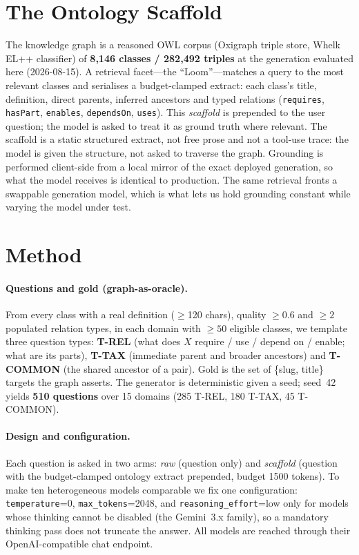 \documentclass[11pt]{article}
\begin{document}
\section{The Ontology Scaffold}\label{sec:scaffold}
The knowledge graph is a reasoned OWL corpus (Oxigraph triple store, Whelk EL++ classifier)
of \textbf{8{,}146 classes / 282{,}492 triples} at the generation evaluated here
(2026-08-15). A retrieval facet---the ``Loom''---matches a query to the most relevant classes
and serialises a budget-clamped extract: each class's title, definition, direct parents,
inferred ancestors and typed relations (\texttt{requires}, \texttt{hasPart}, \texttt{enables},
\texttt{dependsOn}, \texttt{uses}). This \emph{scaffold} is prepended to the user question; the
model is asked to treat it as ground truth where relevant. The scaffold is a static structured
extract, not free prose and not a tool-use trace: the model is given the structure, not asked to
traverse the graph. Grounding is performed client-side from a local mirror of the exact deployed
generation, so what the model receives is identical to production. The same retrieval fronts a
swappable generation model, which is what lets us hold grounding constant while varying the model
under test.

\section{Method}\label{sec:method}
\paragraph{Questions and gold (graph-as-oracle).}
From every class with a real definition ($\geq$120 chars), quality $\geq 0.6$ and $\geq 2$
populated relation types, in each domain with $\geq 50$ eligible classes, we template three
question types: \textbf{T-REL} (what does $X$ require / use / depend on / enable; what are its
parts), \textbf{T-TAX} (immediate parent and broader ancestors) and \textbf{T-COMMON} (the shared
ancestor of a pair). Gold is the set of \{slug, title\} targets the graph asserts. The generator
is deterministic given a seed; seed~42 yields \textbf{510 questions} over 15 domains (285 T-REL,
180 T-TAX, 45 T-COMMON).

\paragraph{Design and configuration.}
Each question is asked in two arms: \emph{raw} (question only) and \emph{scaffold} (question with
the budget-clamped ontology extract prepended, budget 1500 tokens). To make ten heterogeneous
models comparable we fix one configuration: \texttt{temperature}=0, \texttt{max\_tokens}=2048,
and \texttt{reasoning\_effort}=low only for models whose thinking cannot be disabled (the
Gemini~3.x family), so a mandatory thinking pass does not truncate the answer. All models are
reached through their OpenAI-compatible chat endpoint.
\end{document}
